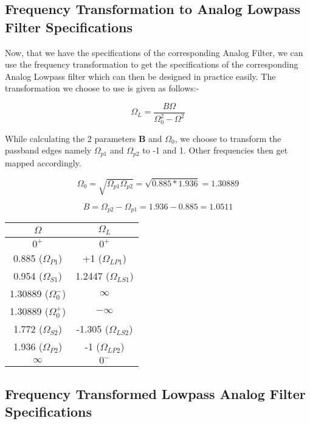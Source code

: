 \documentclass[12pt]{article}
\begin{document}
\subsection{Frequency Transformation to Analog Lowpass Filter Specifications}

Now, that we have the specifications of the corresponding Analog Filter, we can use the frequency transformation to get the specifications of the corresponding Analog Lowpass filter which can then be designed in practice easily. The transformation we choose to use is given as follows:-

\[\Omega_{L} = \frac{B\Omega}{\Omega_{0}^2 - \Omega^2}\]

While calculating the 2 parameters \textbf{B} and \textbf{$\Omega_{0}$}, we choose to transform the passband edges namely $\Omega_{p1}$ and $\Omega_{p2}$ to -1 and 1. Other frequencies then get mapped accordingly.


\[\Omega_{0} = \sqrt{\Omega_{p1}\Omega_{p2}} = \sqrt{0.885*1.936} = 1.30889\]


\[B = \Omega_{p2} - \Omega_{p1} = 1.936 - 0.885 = 1.0511\]


\newpage

\begin{center}
    \begin{tabular}{|c|c|}
     \hline
    $\Omega$ & $\Omega_{L}$ \\ \hline
    $0^+$ & $0^+$ \\ \hline
    0.885 ($\Omega_{P1}$) & +1 ($\Omega_{LP1}$)\\ \hline
    0.954 ($\Omega_{S1}$) & 1.2447 ($\Omega_{LS1}$) \\ \hline
    1.30889 ($\Omega_{0}^-$) & $\infty$ \\ \hline
    1.30889 ($\Omega_{0}^+$) & $-\infty$ \\ \hline
    1.772 ($\Omega_{S2}$) & -1.305 ($\Omega_{LS2}$) \\ \hline
    1.936 ($\Omega_{P2}$) & -1 ($\Omega_{LP2}$)\\ \hline
    $\infty$ & $0^-$ \\ \hline
    \end{tabular}
\end{center}

\subsection{Frequency Transformed Lowpass Analog Filter \\ Specifications}
\end{document}
